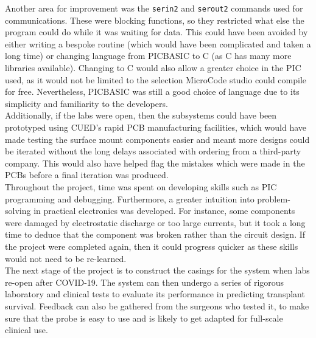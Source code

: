 Another area for improvement was the \verb|serin2| and \verb|serout2| commands used for communications. These were blocking functions, so they restricted what else the program could do while it was waiting for data. This could have been avoided by either writing a bespoke routine (which would have been complicated and taken a long time) or changing language from PICBASIC to C (as C has many more libraries available). Changing to C would also allow a greater choice in the PIC used, as it would not be limited to the selection MicroCode studio could compile for free. Nevertheless, PICBASIC was still a good choice of language due to its simplicity and familiarity to the developers.\\

Additionally, if the labs were open, then the subsystems could have been prototyped using CUED's rapid PCB manufacturing facilities, which would have made testing the surface mount components easier and meant more designs could be iterated without the long delays associated with ordering from a third-party company. This would also have helped flag the mistakes which were made in the PCBs before a final iteration was produced. \\

Throughout the project, time was spent on developing skills such as PIC programming and debugging. Furthermore, a greater intuition into problem-solving in practical electronics was developed. For instance, some components were damaged by electrostatic discharge or too large currents, but it took a long time to deduce that the component was broken rather than the circuit design. If the project were completed again, then it could progress quicker as these skills would not need to be re-learned. \\

The next stage of the project is to construct the casings for the system when labs re-open after COVID-19. The system can then undergo a series of rigorous laboratory and clinical tests to evaluate its performance in predicting transplant survival. Feedback can also be gathered from the surgeons who tested it, to make sure that the probe is easy to use and is likely to get adapted for full-scale clinical use.\\